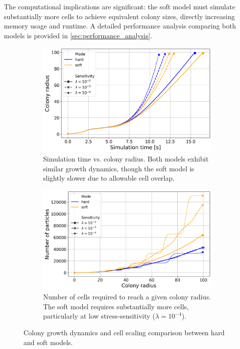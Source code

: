 \documentclass[conference]{IEEEtran}
\begin{document}
The computational implications are significant: the soft model must simulate substantially more cells to achieve equivalent colony sizes, directly increasing memory usage and runtime. A detailed performance analysis comparing both models is provided in \autoref{sec:performance_analysis}.

\begin{figure}[h]
    \centering
    \begin{subfigure}[b]{\linewidth}
        \centering
        \includegraphics[width=\linewidth]{figures/comparison_plots/combined_simulation_time [s]_vs_colony_radius.png}
        \caption{Simulation time vs. colony radius. Both models exhibit similar growth dynamics, though the soft model is slightly slower due to allowable cell overlap.}
        \label{fig:sim_time_vs_colony_radius}
    \end{subfigure}

    \begin{subfigure}[b]{\linewidth}
        \centering
        \includegraphics[width=\linewidth]{figures/comparison_plots/combined_colony_radius_vs_num_particles.png}
        \caption{Number of cells required to reach a given colony radius. The soft model requires substantially more cells, particularly at low stress-sensitivity ($\lambda = 10^{-4}$).}
        \label{fig:colony_radius_vs_num_cells}
    \end{subfigure}

    \caption{Colony growth dynamics and cell scaling comparison between hard and soft models.}
    \label{fig:comparison_combined}
\end{figure}
\end{document}
